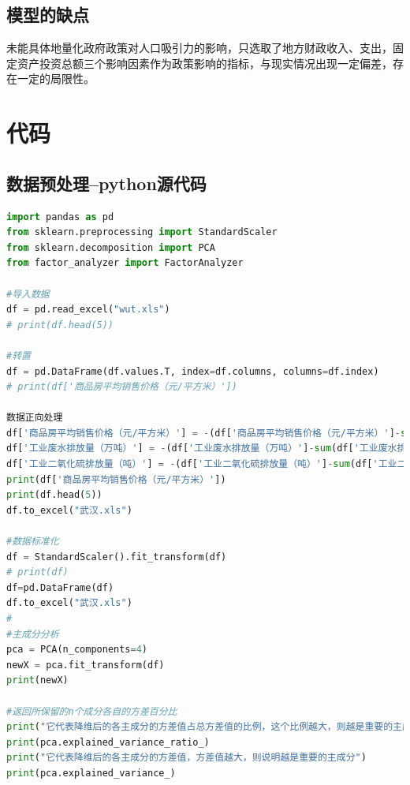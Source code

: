 \documentclass{whutmod}
\begin{document}
	
	\subsection{模型的缺点}
    未能具体地量化政府政策对人口吸引力的影响，只选取了地方财政收入、支出，固定资产投资总额三个影响因素作为政策影响的指标，与现实情况出现一定偏差，存在一定的局限性。

    
    
	\newpage	%
	\nocite{*}		%

	
	\newpage
	\appendix %
\section{代码}
\subsection{数据预处理--python源代码}
\begin{lstlisting}[language=python]%这里修改语言
import pandas as pd
from sklearn.preprocessing import StandardScaler
from sklearn.decomposition import PCA
from factor_analyzer import FactorAnalyzer

#导入数据
df = pd.read_excel("wut.xls")
# print(df.head(5))

#转置
df = pd.DataFrame(df.values.T, index=df.columns, columns=df.index)
# print(df['商品房平均销售价格（元/平方米）'])

数据正向处理
df['商品房平均销售价格（元/平方米）'] = -(df['商品房平均销售价格（元/平方米）']-sum(df['商品房平均销售价格（元/平方米）'])/5)
df['工业废水排放量（万吨）'] = -(df['工业废水排放量（万吨）']-sum(df['工业废水排放量（万吨）'])/5)
df['工业二氧化硫排放量（吨）'] = -(df['工业二氧化硫排放量（吨）']-sum(df['工业二氧化硫排放量（吨）'])/5)
print(df['商品房平均销售价格（元/平方米）'])
print(df.head(5))
df.to_excel("武汉.xls")

#数据标准化
df = StandardScaler().fit_transform(df)
# print(df)
df=pd.DataFrame(df)
df.to_excel("武汉.xls")
#
#主成分分析
pca = PCA(n_components=4)
newX = pca.fit_transform(df)
print(newX)

#返回所保留的n个成分各自的方差百分比
print("它代表降维后的各主成分的方差值占总方差值的比例，这个比例越大，则越是重要的主成分")
print(pca.explained_variance_ratio_)
print("它代表降维后的各主成分的方差值，方差值越大，则说明越是重要的主成分")
print(pca.explained_variance_)

\end{lstlisting}
\end{document}
